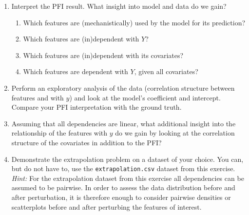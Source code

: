 {\begin{enumerate}
\begin{itemize}
    \end{itemize}
    \textit{Hint: By passing the single-feature importance function \texttt{fi\_fname} as an argument you can reuse \texttt{fi} and \texttt{n\_times} later on for other feature importance methods and only have to adjust \texttt{fi\_fname} accordingly.
    In order to allow for different function signatures you may use \texttt{f(*args, **kwargs)} in python (more info \href{https://realpython.com/python-kwargs-and-args/}{here}) and \texttt{f(...)} in R (more info \href{https://stackoverflow.com/questions/8165837/how-to-pass-a-function-and-its-arguments-through-a-wrapper-function-in-r-simila}{here}).}
    \item
    Interpret the PFI result. What insight into model and data do we gain?
    \begin{enumerate}
        \item Which features are (mechanistically) used by the model for its prediction?
        \item Which features are (in)dependent with $Y$?
        \item Which features are (in)dependent with its covariates?
        \item Which features are dependent with $Y$, given all covariates?
    \end{enumerate}
    \item
    Perform an exploratory analysis of the data (correlation structure between features and with $y$) and look at the model's coefficient and intercept. Compare your PFI interpretation with the ground truth.
    \item
    Assuming that all dependencies are linear, what additional insight into the relationship of the features with $y$ do we gain by looking at the correlation structure of the covariates in addition to the PFI?
    \item
    Demonstrate the extrapolation problem on a dataset of your choice. You can, but do not have to, use the \texttt{extrapolation.csv} dataset from this exercise. \\
    \textit{Hint:} For the extrapolation dataset from this exercise all dependencies can be assumed to be pairwise. In order to assess the data distribution before and after perturbation, it is therefore enough to consider pairwise densities or scatterplots before and after perturbing the features of interest.
\end{enumerate}

}
